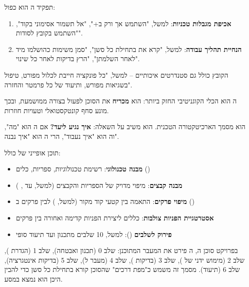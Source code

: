 תפקיד ה הוא כפול:
\begin{enumerate}
  \item \textbf{אכיפת מגבלות טכניות}: למשל, "השתמש אך ורק ב+", "אל תשמור אסימוני  בקוד", "השתמש בקובץ  לסודות".
  \item \textbf{הנחיית תהליך עבודה}: למשל, "קרא את  בתחילת כל סשן", "סמן משימות כהושלמו מיד לאחר השלמתן", "הרץ בדיקות לאחר כל שינוי".
\end{enumerate}

הקובץ כולל גם סטנדרטים איכותיים – למשל, "כל פונקציה חייבת לכלול  מפורט, טיפול בשגיאות מפורש, ותיעוד של כל פרמטר והחזרה".

ה הוא הכלי הקוגניטיבי החזק ביותר: הוא \textbf{מכריח} את הסוכן לפעול בצורה ממושמעת, ובכך מונע סחף קונטקסטואלי וטעויות חוזרות.


\textbf{} הוא מסמך הארכיטקטורה הטכנית. הוא משיב על השאלה: \textbf{איך נגיע ליעד?} אם ה הוא "מה", וה הוא "איך נעבוד", הרי ה הוא "איך נבנה".

תוכן אופייני של  כולל:
\begin{itemize}
  \item \textbf{מבנה טכנולוגי}: רשימת טכנולוגיות, ספריות, כלים ()
  \item \textbf{מבנה קבצים}: מיפוי מדויק של הספריות והקבצים (למשל,  עד , )
  \item \textbf{מיפוי פרקים}: התאמה בין קטעי קוד מקור (למשל, ) לבין פרקים ב ()
  \item \textbf{אסטרטגיית הפניות צולבות}: כללים ליצירת הפניות קדימה ואחורה בין פרקים
  \item \textbf{פירוק לשלבים} (): למשל, \num{10} שלבים מתכנון ועד תיעוד סופי
\end{itemize}

בפרויקט סוכן ה, ה פירט את המעבר המתוכנן: שלב \num{0} (תכנון ואבטחה), שלב \num{1} (הגדרת ), שלב \num{2} (מימוש ידני של ), שלב \num{3} (בדיקות ), שלב \num{4} (מעבר ל), שלב \num{5} (בדיקות אינטגרציה), שלב \num{6} (תיעוד). מסמך זה משמש כ"מפת דרכים" שהסוכן קורא בתחילת כל סשן כדי להבין היכן הוא נמצא במסע.

